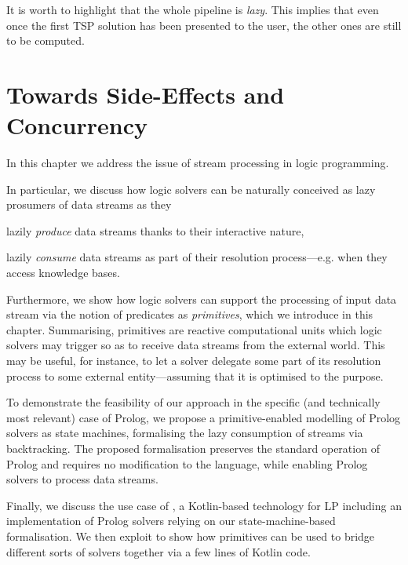 \documentclass[12pt,a4paper,openright,twoside]{book}
\begin{document}
It is worth to highlight that the whole pipeline is \emph{lazy}.
%
This implies that even once the first TSP solution has been presented to the user, the other ones are still to be computed.

\section{Towards Side-Effects and Concurrency}


In this chapter we address the issue of stream processing in logic programming.

In particular, we discuss how logic solvers can be naturally conceived as lazy prosumers of data streams as they
%
\begin{inlinelist}
    \item lazily \emph{produce} data streams thanks to their interactive nature,
    \item lazily \emph{consume} data streams as part of their resolution process---e.g. when they access knowledge bases.
\end{inlinelist}
%
Furthermore, we show how logic solvers can support the processing of input data stream via the notion of predicates as \emph{primitives}, which we introduce in this chapter.
%
Summarising, primitives are reactive computational units which logic solvers may trigger so as to receive data streams from the external world.
%
This may be useful, for instance, to let a solver delegate some part of its resolution process to some external entity---assuming that it is optimised to the purpose.

To demonstrate the feasibility of our approach in the specific (and technically most relevant) case of Prolog, we propose a primitive-enabled modelling of Prolog solvers as state machines, formalising the lazy consumption of streams via backtracking.
%
The proposed formalisation preserves the standard operation of Prolog and requires no modification to the language, while enabling Prolog solvers to process data streams.

Finally, we discuss the use case of \twopkt{} \cite{homepage2PKt}, a Kotlin-based technology for LP including an implementation of Prolog solvers relying on our state-machine-based formalisation.
%
We then exploit \twopkt{} to show how primitives can be used to bridge different sorts of solvers together via a few lines of Kotlin code.
\end{document}
